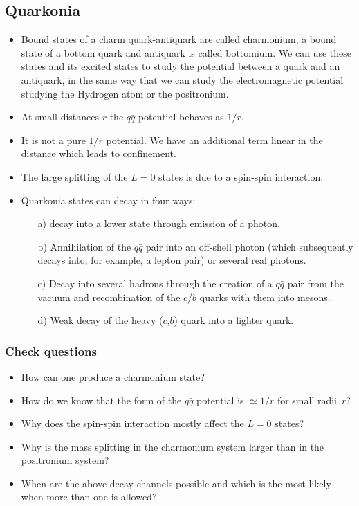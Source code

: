 \documentclass[12pt]{article}
\begin{document}
  \subsection{Quarkonia}
  \begin{itemize}
  \item Bound states of a charm quark-antiquark are called charmonium, a bound state of a bottom quark and antiquark is called bottomium. We can use these states and its excited states to study the potential between a quark and an antiquark, in the same way that we can study the electromagnetic potential studying the Hydrogen atom or the positronium.
  \item At small distances $r$ the $q\bar{q}$ potential behaves as $1/r$.
  \item It is not a pure $1/r$ potential. We have an additional term linear in the distance which leads to confinement.
  \item The large splitting of the $L=0$ states is due to a spin-spin interaction.
  \item Quarkonia states can decay in four ways: \begin{itemize}
  \item[a)] decay into a lower state through emission of a photon.
  \item[b)] Annihilation of the $q\bar{q}$ pair into an off-shell photon (which subsequently decays into, for example, a lepton pair) or several real photons.
  \item[c)] Decay into several hadrons through the creation of a $q\bar{q}$ pair from the vacuum and recombination of the $c$/$b$ quarks with them into mesons.
  \item[d)] Weak decay of the heavy ($c$,$b$) quark into a lighter quark.
    \end{itemize}
  \end{itemize}
  \subsubsection{Check questions}
  \begin{itemize}
  \item How can one produce a charmonium state?
  \item How do we know that the form of the $q\bar{q}$ potential is $\simeq 1/r$ for small radii~$r$?
  \item Why does the spin-spin interaction mostly affect the $L=0$ states?
  \item Why is the mass splitting in the charmonium system larger than in the positronium system?
    \item When are the above decay channels possible and which is the most likely when more than one is allowed?
  \end{itemize}
\end{document}
